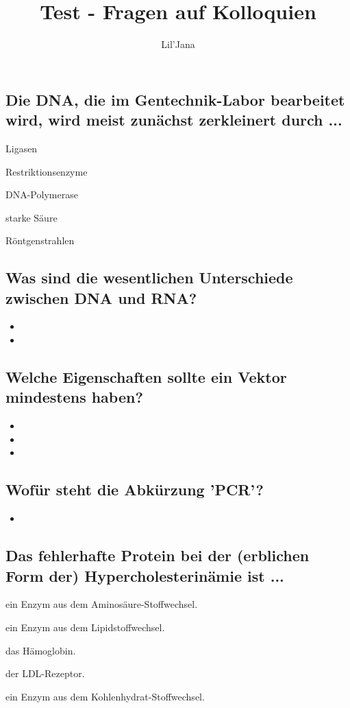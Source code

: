 \documentclass{article}
\title{Test - Fragen auf Kolloquien}
\author{Lil'Jana}
\begin{document}
\maketitle
\subsection*{Die DNA, die im Gentechnik-Labor bearbeitet wird, wird meist zunächst zerkleinert durch ...}
\begin{todolist}
\item Ligasen  
\item  Restriktionsenzyme
\item DNA-Polymerase  
\item starke Säure  
\item Röntgenstrahlen  
\end{todolist}
\subsection*{Was sind die wesentlichen Unterschiede zwischen DNA und RNA?}
\begin{itemize}
    \item 
    \item 
\end{itemize}
\subsection*{Welche Eigenschaften sollte ein Vektor mindestens haben?}
\begin{itemize}
    \item 
    \item 
    \item    
\end{itemize}
\subsection*{Wofür steht die Abkürzung 'PCR'?}
\begin{itemize}
    \item 
\end{itemize}

\subsection*{Das fehlerhafte Protein bei der (erblichen Form der) Hypercholesterinämie ist ...}
\begin{todolist}
\item ein Enzym aus dem Aminosäure-Stoffwechsel.  
\item ein Enzym aus dem Lipidstoffwechsel.   
\item das Hämoglobin. 
\item  der LDL-Rezeptor. 
\item ein Enzym aus dem Kohlenhydrat-Stoffwechsel. 
\end{todolist} 
\end{document}
